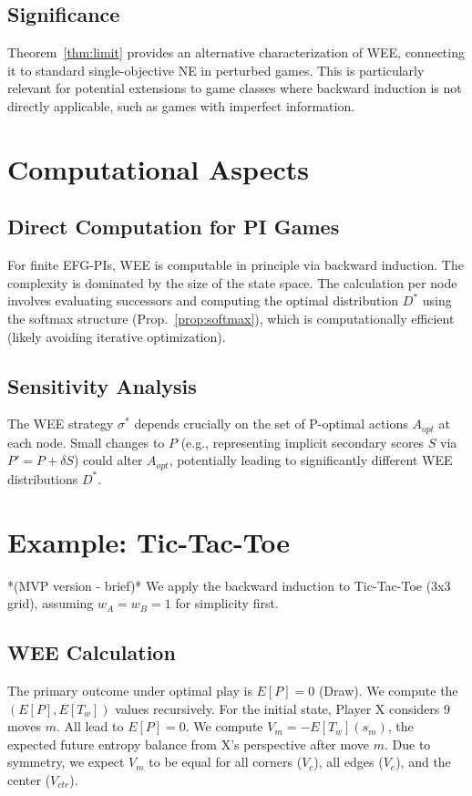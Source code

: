 \documentclass{article}
\begin{document}
\subsection{Significance}
Theorem~\ref{thm:limit} provides an alternative characterization of WEE, connecting it to standard single-objective NE in perturbed games. This is particularly relevant for potential extensions to game classes where backward induction is not directly applicable, such as games with imperfect information.

\section{Computational Aspects}

\subsection{Direct Computation for PI Games}
For finite EFG-PIs, WEE is computable in principle via backward induction. The complexity is dominated by the size of the state space. The calculation per node involves evaluating successors and computing the optimal distribution $D^*$ using the softmax structure (Prop.~\ref{prop:softmax}), which is computationally efficient (likely avoiding iterative optimization).

\subsection{Sensitivity Analysis}
The WEE strategy $\sigma^*$ depends crucially on the set of P-optimal actions $A_{opt}$ at each node. Small changes to $P$ (e.g., representing implicit secondary scores $S$ via $P' = P + \delta S$) could alter $A_{opt}$, potentially leading to significantly different WEE distributions $D^*$.

\section{Example: Tic-Tac-Toe}

*(MVP version - brief)*
We apply the backward induction to Tic-Tac-Toe (3x3 grid), assuming $w_A = w_B = 1$ for simplicity first.

\subsection{WEE Calculation}
The primary outcome under optimal play is $E[P]=0$ (Draw). We compute the $(E[P], E[T_w])$ values recursively. For the initial state, Player X considers 9 moves $m$. All lead to $E[P]=0$. We compute $V_m = -E[T_w](s_m)$, the expected future entropy balance from X's perspective after move $m$. Due to symmetry, we expect $V_m$ to be equal for all corners ($V_c$), all edges ($V_e$), and the center ($V_{ctr}$).
\end{document}
